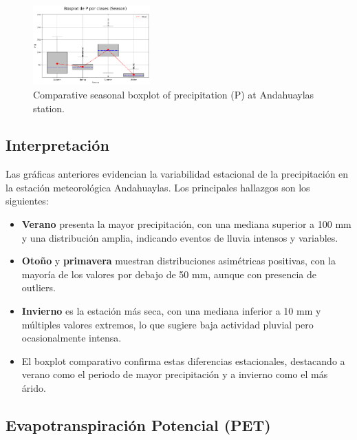 \vspace{0.2cm}

\begin{figure}[H]
\centering
\includegraphics[width=0.4\textwidth]{resultados/por_estacion_del_anio/boxplot_clases_por_estacion/Andahuaylas/P_ClassBoxplot_Season.png}
\caption{Comparative seasonal boxplot of precipitation (P) at Andahuaylas station.}
\label{fig:andahuaylas_p_box}
\end{figure}

\subsection*{Interpretación}

Las gráficas anteriores evidencian la variabilidad estacional de la precipitación en la estación meteorológica Andahuaylas. Los principales hallazgos son los siguientes:

\begin{itemize}
    \item \textbf{Verano} presenta la mayor precipitación, con una mediana superior a 100 mm y una distribución amplia, indicando eventos de lluvia intensos y variables.
    \item \textbf{Otoño} y \textbf{primavera} muestran distribuciones asimétricas positivas, con la mayoría de los valores por debajo de 50 mm, aunque con presencia de outliers.
    \item \textbf{Invierno} es la estación más seca, con una mediana inferior a 10 mm y múltiples valores extremos, lo que sugiere baja actividad pluvial pero ocasionalmente intensa.
    \item El boxplot comparativo confirma estas diferencias estacionales, destacando a verano como el periodo de mayor precipitación y a invierno como el más árido.
\end{itemize}


\subsection{Evapotranspiración Potencial (PET)}

